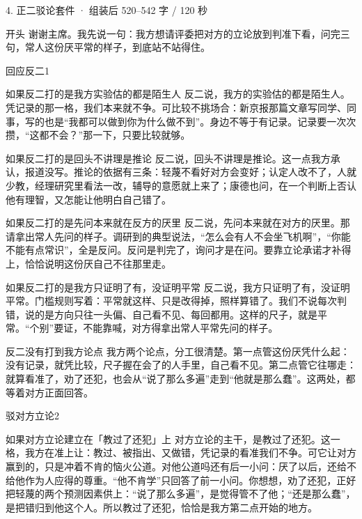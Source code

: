 \documentclass[script,pro]{debate}
\begin{document}
\begin{kit}{4. 正二驳论}{套件 · 组装后 520–542 字 / 120 秒}
\begin{fixed}{开头}
谢谢主席。我先说一句：我方想请评委把对方的立论放到判准下看，问完三句，常人这份厌平常的样子，到底站不站得住。
\end{fixed}
\begin{pick}{回应反二}{1}
\begin{module}{如果反二打的是我方实验估的都是陌生人}
反二说，我方的实验估的都是陌生人。凭记录的那一格，我们本来就不争。可比较不挑场合：新京报那篇文章写同学、同事，写的也是“我都可以做到你为什么做不到”。身边不等于有记录。记录要一次次攒，“这都不会？”那一下，只要比较就够。
\end{module}
\begin{module}{如果反二打的是回头不讲理是推论}
反二说，回头不讲理是推论。这一点我方承认，报道没写。推论的依据有三条：轻蔑不看好对方会变好；认定人改不了，人就少教，经理研究里看法一改，辅导的意愿就上来了；康德也问，在一个判断上否认他有理智，又怎能让他明白自己错了。
\end{module}
\begin{module}{如果反二打的是先问本来就在反方的厌里}
反二说，先问本来就在对方的厌里。那请拿出常人先问的样子。调研到的典型说法，“怎么会有人不会坐飞机啊”，“你能不能有点常识”，全是反问。反问是判完了，询问才是在问。要靠立论承诺才补得上，恰恰说明这份厌自己不往那里走。
\end{module}
\begin{module}{如果反二打的是我方只证明了有，没证明平常}
反二说，我方只证明了有，没证明平常。门槛规则写着：平常就这样、只是改得掉，照样算错了。我们不说每次判错，说的是方向只往一头偏、自己看不见、每回都用。这样的尺子，就是平常。“个别”要证，不能靠喊，对方得拿出常人平常先问的样子。
\end{module}
\begin{fallback}{反二没有打到我方论点}
我方两个论点，分工很清楚。第一点管这份厌凭什么起：没有记录，就凭比较，尺子握在会了的人手里，自己看不见。第二点管它往哪走：就算看准了，劝了还犯，也会从“说了那么多遍”走到“他就是那么蠢”。这两处，都等着对方正面回答。
\end{fallback}
\end{pick}
\begin{pick}{驳对方立论}{2}
\begin{module}{如果对方立论建立在「教过了还犯」上}
对方立论的主干，是教过了还犯。这一格，我方在准上让：教过、被指出、又做错，凭记录的看准我们不争。可它让对方赢到的，只是冲着不肯的恼火公道。对他公道吗还有后一小问：厌了以后，还给不给他作为人应得的尊重。“他不肯学”只回答了前一小问。你想想，劝了还犯，正好把轻蔑的两个预测因素供上：“说了那么多遍”，是觉得管不了他；“还是那么蠢”，是把错归到他这个人。所以教过了还犯，恰恰是我方第二点开始的地方。

\end{module}
\end{pick}
\end{kit}
\end{document}

